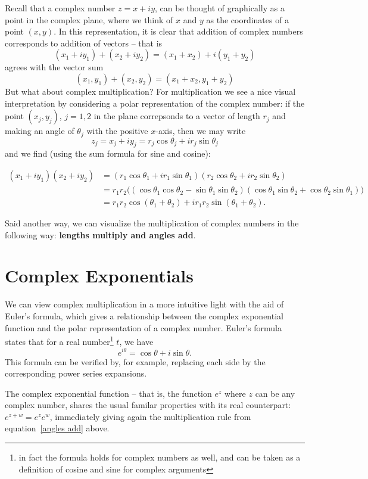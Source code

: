 \documentclass[12pt]{report}
\theoremstyle{plain}
\begin{document}
Recall that a complex number $z = x + iy$, can be thought of graphically as a point in the complex plane, where we think of $x$ and $y$ as the coordinates of a point $(x, y)$. In this representation, it is clear that addition of complex numbers corresponds to addition of vectors -- that is
\[ (x_1 + i y_1) + (x_2 + i y_2) = (x_1 + x_2) + i (y_1 + y_2)\]
agrees with the vector sum
\[ (x_1, y_1) + (x_2, y_2) = (x_1 + x_2, y_1 + y_2) \]
But what about complex multiplication? For multiplication we see a nice visual interpretation by considering a polar representation of the complex number: if the point $(x_j, y_j)$, $j = 1, 2$ in the plane correpsonds to a vector of length $r_j$ and making an angle of $\theta_j$ with the positive $x$-axis, then we may write
\[z_j = x_j + i y_j = r_j \cos \theta_j + i r_j \sin \theta_j \]
and we find (using the sum formula for sine and cosine):

\begin{align} \label{angles add}
(x_1 + i y_1)(x_2 + i y_2) &= (r_1 \cos \theta_1 + i r_1 \sin \theta_1)(r_2 \cos \theta_2 + i r_2 \sin \theta_2) \\ &= r_1 r_2 \Big( (\cos \theta_1 \cos \theta_2 - \sin \theta_1 \sin \theta_2) (\cos \theta_1 \sin \theta_2 + \cos \theta_2 \sin \theta_1 )\Big) \\ &= r_1 r_2 \cos (\theta_1 + \theta_2) + i r_1 r_2 \sin (\theta_1 + \theta_2).
\end{align}

Said another way, we can visualize the multiplication of complex numbers in the following way: \textbf{lengths multiply and angles add}.

\section{Complex Exponentials}

We can view complex multiplication in a more intuitive light with the aid of Euler's formula, which gives a relationship between the complex exponential function and the polar representation of a complex number. Euler's formula states that for a real number\footnote{in fact the formula holds for complex numbers as well, and can be taken as a definition of cosine and sine for complex arguments} $t$, we have
\[e^{i \theta} = \cos \theta + i \sin \theta. \]
This formula can be verified by, for example, replacing each side by the corresponding power series expansions.

The complex exponential function -- that is, the function $e^z$ where $z$ can be any complex number, shares the usual familar properties with its real counterpart: $e^{z + w} = e^z e^w$, immediately giving again the multiplication rule from equation~\ref{angles add} above.
\end{document}
